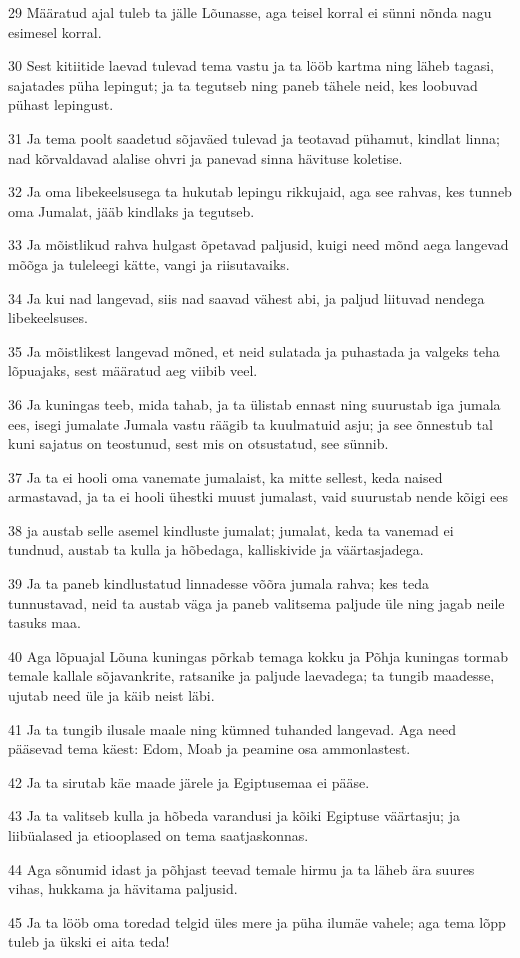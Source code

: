 \par 29 Määratud ajal tuleb ta jälle Lõunasse, aga teisel korral ei sünni nõnda nagu esimesel korral.
\par 30 Sest kitiitide laevad tulevad tema vastu ja ta lööb kartma ning läheb tagasi, sajatades püha lepingut; ja ta tegutseb ning paneb tähele neid, kes loobuvad pühast lepingust.
\par 31 Ja tema poolt saadetud sõjaväed tulevad ja teotavad pühamut, kindlat linna; nad kõrvaldavad alalise ohvri ja panevad sinna hävituse koletise.
\par 32 Ja oma libekeelsusega ta hukutab lepingu rikkujaid, aga see rahvas, kes tunneb oma Jumalat, jääb kindlaks ja tegutseb.
\par 33 Ja mõistlikud rahva hulgast õpetavad paljusid, kuigi need mõnd aega langevad mõõga ja tuleleegi kätte, vangi ja riisutavaiks.
\par 34 Ja kui nad langevad, siis nad saavad vähest abi, ja paljud liituvad nendega libekeelsuses.
\par 35 Ja mõistlikest langevad mõned, et neid sulatada ja puhastada ja valgeks teha lõpuajaks, sest määratud aeg viibib veel.
\par 36 Ja kuningas teeb, mida tahab, ja ta ülistab ennast ning suurustab iga jumala ees, isegi jumalate Jumala vastu räägib ta kuulmatuid asju; ja see õnnestub tal kuni sajatus on teostunud, sest mis on otsustatud, see sünnib.
\par 37 Ja ta ei hooli oma vanemate jumalaist, ka mitte sellest, keda naised armastavad, ja ta ei hooli ühestki muust jumalast, vaid suurustab nende kõigi ees
\par 38 ja austab selle asemel kindluste jumalat; jumalat, keda ta vanemad ei tundnud, austab ta kulla ja hõbedaga, kalliskivide ja väärtasjadega.
\par 39 Ja ta paneb kindlustatud linnadesse võõra jumala rahva; kes teda tunnustavad, neid ta austab väga ja paneb valitsema paljude üle ning jagab neile tasuks maa.
\par 40 Aga lõpuajal Lõuna kuningas põrkab temaga kokku ja Põhja kuningas tormab temale kallale sõjavankrite, ratsanike ja paljude laevadega; ta tungib maadesse, ujutab need üle ja käib neist läbi.
\par 41 Ja ta tungib ilusale maale ning kümned tuhanded langevad. Aga need pääsevad tema käest: Edom, Moab ja peamine osa ammonlastest.
\par 42 Ja ta sirutab käe maade järele ja Egiptusemaa ei pääse.
\par 43 Ja ta valitseb kulla ja hõbeda varandusi ja kõiki Egiptuse väärtasju; ja liibüalased ja etiooplased on tema saatjaskonnas.
\par 44 Aga sõnumid idast ja põhjast teevad temale hirmu ja ta läheb ära suures vihas, hukkama ja hävitama paljusid.
\par 45 Ja ta lööb oma toredad telgid üles mere ja püha ilumäe vahele; aga tema lõpp tuleb ja ükski ei aita teda!

